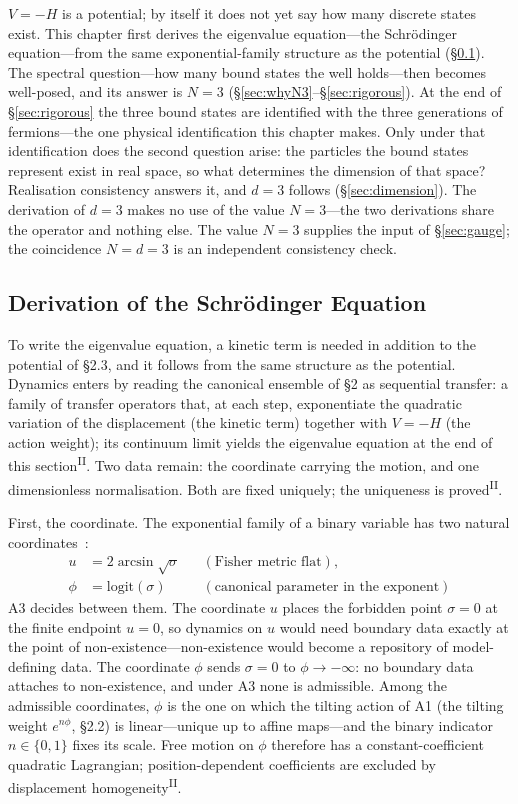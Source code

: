 \documentclass[12pt,a4paper]{article}
\newcommand{\PII}{\textsuperscript{\textup{II}}}
\begin{document}
$V = -H$ is a potential; by itself it does not yet say how many discrete states exist. This chapter first derives the eigenvalue equation---the Schr\"odinger equation---from the same exponential-family structure as the potential (\S\ref{sec:kinetic}). The spectral question---how many bound states the well holds---then becomes well-posed, and its answer is $N = 3$ (\S\ref{sec:whyN3}--\S\ref{sec:rigorous}). At the end of \S\ref{sec:rigorous} the three bound states are identified with the three generations of fermions---the one physical identification this chapter makes. Only under that identification does the second question arise: the particles the bound states represent exist in real space, so what determines the dimension of that space? Realisation consistency answers it, and $d = 3$ follows (\S\ref{sec:dimension}). The derivation of $d = 3$ makes no use of the value $N = 3$---the two derivations share the operator and nothing else. The value $N = 3$ supplies the input of \S\ref{sec:gauge}; the coincidence $N = d = 3$ is an independent consistency check.

\subsection{Derivation of the Schr\"odinger Equation}\label{sec:kinetic}

To write the eigenvalue equation, a kinetic term is needed in addition to the potential of \S2.3, and it follows from the same structure as the potential. Dynamics enters by reading the canonical ensemble of \S2 as sequential transfer: a family of transfer operators that, at each step, exponentiate the quadratic variation of the displacement (the kinetic term) together with $V = -H$ (the action weight); its continuum limit yields the eigenvalue equation at the end of this section\PII{}. Two data remain: the coordinate carrying the motion, and one dimensionless normalisation. Both are fixed uniquely; the uniqueness is proved\PII{}.

First, the coordinate. The exponential family of a binary variable has two natural coordinates~\cite{cencov,amari,ay}:
\[
\begin{aligned}
  u &= 2\arcsin\sqrt{\sigma} &&(\text{Fisher metric flat}),\\
  \phi &= \mathrm{logit}(\sigma) &&(\text{canonical parameter in the exponent})
\end{aligned}
\]
A3 decides between them. The coordinate $u$ places the forbidden point $\sigma = 0$ at the finite endpoint $u = 0$, so dynamics on $u$ would need boundary data exactly at the point of non-existence---non-existence would become a repository of model-defining data. The coordinate $\phi$ sends $\sigma = 0$ to $\phi \to -\infty$: no boundary data attaches to non-existence, and under A3 none is admissible. Among the admissible coordinates, $\phi$ is the one on which the tilting action of A1 (the tilting weight $e^{n\phi}$, \S2.2) is linear---unique up to affine maps---and the binary indicator $n \in \{0,1\}$ fixes its scale. Free motion on $\phi$ therefore has a constant-coefficient quadratic Lagrangian; position-dependent coefficients are excluded by displacement homogeneity\PII{}.
\end{document}

